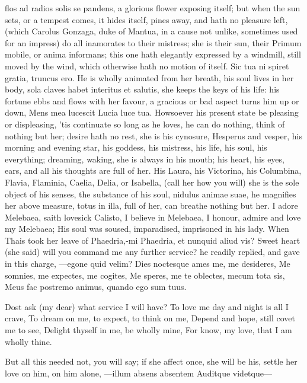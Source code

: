 {flos ad radios solis se pandens, a glorious flower exposing itself;
but when the sun sets, or a tempest comes, it hides itself, pines
away, and hath no pleasure left, (which Carolus Gonzaga, duke of
Mantua, in a cause not unlike, sometimes used for an impress) do all
inamorates to their mistress; she is their sun, their Primum mobile, or
anima informans; this one hath elegantly expressed by a windmill,
still moved by the wind, which otherwise hath no motion of itself. Sic
tua ni spiret gratia, truncus ero. He is wholly animated from her
breath, his soul lives in her body, sola claves habet interitus
et salutis, she keeps the keys of his life: his fortune ebbs and flows
with her favour, a gracious or bad aspect turns him up or down, Mens
mea lucescit Lucia luce tua. Howsoever his present state be pleasing or
displeasing, 'tis continuate so long as he loves, he can do
nothing, think of nothing but her; desire hath no rest, she is his
cynosure, Hesperus and vesper, his morning and evening star, his
goddess, his mistress, his life, his soul, his everything; dreaming,
waking, she is always in his mouth; his heart, his eyes, ears, and all
his thoughts are full of her. His Laura, his Victorina, his Columbina,
Flavia, Flaminia, Caelia, Delia, or Isabella, (call her how you will)
she is the sole object of his senses, the substance of his soul,
nidulus animae suae, he magnifies her above measure, totus in illa,
full of her, can breathe nothing but her. I adore Melebaea, saith
lovesick Calisto, I believe in Melebaea, I honour, admire and
love my Melebaea; His soul was soused, imparadised, imprisoned in his
lady. When Thais took her leave of Phaedria,-mi Phaedria, et
nunquid aliud vis? Sweet heart (she said) will you command me any
further service? he readily replied, and gave in this charge,
---egone quid velim?
Dies noctesque ames me, me desideres,
Me somnies, me expectes, me cogites,
Me speres, me te oblectes, mecum tota sis,
Meus fac postremo animus, quando ego sum tuus.

Dost ask (my dear) what service I will have?
To love me day and night is all I crave,
To dream on me, to expect, to think on me,
Depend and hope, still covet me to see,
Delight thyself in me, be wholly mine,
For know, my love, that I am wholly thine.

But all this needed not, you will say; if she affect once, she will be
his, settle her love on him, on him alone,
---illum absens absentem
Auditque videtque---

}
